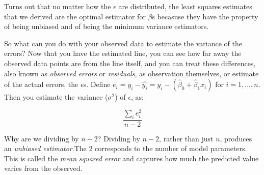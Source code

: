 \begin{tcolorbox}[enhanced jigsaw, breakable, pad at break*=1mm, colback=gray!20!white, colframe=black!85!black, title=\textbf{How to fit the model?}]
    Turns out that no matter how the \(\epsilon\) are distributed, the least squares estimates that we derived are the optimal estimator for \(\beta\)s becasuse they have the property of being unbiased and of being the minimum variance estimators.
\end{tcolorbox}

So what can you do with your observed data to estimate the variance of the errors? Now that you have the estimated line, you can see how far away the observed data points are from the line itself, and you can treat these differences, also known as \textit{observed errors} or \textit{residuals}, as observation themselves, or estimate of the actual errors, the \(\epsilon\)s. Define \(e_{i}=y_{i}-\hat{y_{i}}=y_{i}-\left(\hat{\beta}_{0}+\hat{\beta}_{1} x_{i}\right)\) for \(i=1, \ldots, n\). Then you estimate the variance (\(\sigma^{2}\)) of \(\epsilon\), as:

\begin{equation}
    \frac{\sum_{i} e_{i}^{2}}{n-2}
\end{equation}

Why are we dividing by \(n-2\)? Dividing by \(n-2\), rather than just \(n\), produces an \textit{unbiased estimator}.The 2 corresponds to the number of model parameters. This is called the \textit{mean squared error} and captures how much the predicted value varies from the observed.